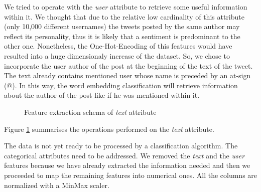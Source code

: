 \documentclass[conference]{IEEEtran}
\begin{document}

We tried to operate with the \textit{user} attribute to retrieve some useful information within it. We thought that due to the relative low cardinality of this attribute (only 10,000 different usernames) the tweets posted by the same author may reflect its personality, thus it is likely that a sentiment is predominant to the other one. Nonetheless, the One-Hot-Encoding\cite{ohe} of this features would have resulted into a huge dimensionaly increase of the dataset. So, we chose to incorporate the user author of the post at the beginning of the text of the tweet. The text already contains mentioned user whose name is preceded by an at-sign (@). In this way, the word embedding classification will retrieve information about the author of the post like if he was mentioned within it.
\begin{figure}[h]
        \centering
        
        \caption{Feature extraction schema of \textit{text} attribute}
        \label{fig:text_schema}
\end{figure}

Figure \ref{fig:text_schema} summarises the operations performed on the \textit{text} attribute.

The data is not yet ready to be processed by a classification algorithm. The categorical attributes need to be addressed. We removed the \textit{text} and the \textit{user} features because we have already extracted the information needed and then we proceeded to map the remaining features into numerical ones. All the columns are normalized with a MinMax scaler\cite{minmax}.
\end{document}
